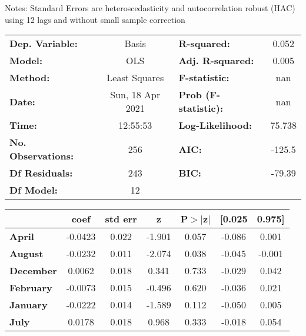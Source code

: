 Notes: \newline
 [1] Standard Errors are heteroscedasticity and autocorrelation robust (HAC) using 12 lags and without small sample correction
\begin{center}
\begin{tabular}{lclc}
\toprule
\textbf{Dep. Variable:}    &      Basis       & \textbf{  R-squared:         } &     0.052   \\
\textbf{Model:}            &       OLS        & \textbf{  Adj. R-squared:    } &     0.005   \\
\textbf{Method:}           &  Least Squares   & \textbf{  F-statistic:       } &       nan   \\
\textbf{Date:}             & Sun, 18 Apr 2021 & \textbf{  Prob (F-statistic):} &      nan    \\
\textbf{Time:}             &     12:55:53     & \textbf{  Log-Likelihood:    } &    75.738   \\
\textbf{No. Observations:} &         256      & \textbf{  AIC:               } &    -125.5   \\
\textbf{Df Residuals:}     &         243      & \textbf{  BIC:               } &    -79.39   \\
\textbf{Df Model:}         &          12      & \textbf{                     } &             \\
\bottomrule
\end{tabular}
\begin{tabular}{lcccccc}
                   & \textbf{coef} & \textbf{std err} & \textbf{z} & \textbf{P$> |$z$|$} & \textbf{[0.025} & \textbf{0.975]}  \\
\midrule
\textbf{April}     &      -0.0423  &        0.022     &    -1.901  &         0.057        &       -0.086    &        0.001     \\
\textbf{August}    &      -0.0232  &        0.011     &    -2.074  &         0.038        &       -0.045    &       -0.001     \\
\textbf{December}  &       0.0062  &        0.018     &     0.341  &         0.733        &       -0.029    &        0.042     \\
\textbf{February}  &      -0.0073  &        0.015     &    -0.496  &         0.620        &       -0.036    &        0.021     \\
\textbf{January}   &      -0.0222  &        0.014     &    -1.589  &         0.112        &       -0.050    &        0.005     \\
\textbf{July}      &       0.0178  &        0.018     &     0.968  &         0.333        &       -0.018    &        0.054     \\

\end{tabular}
\end{center}
